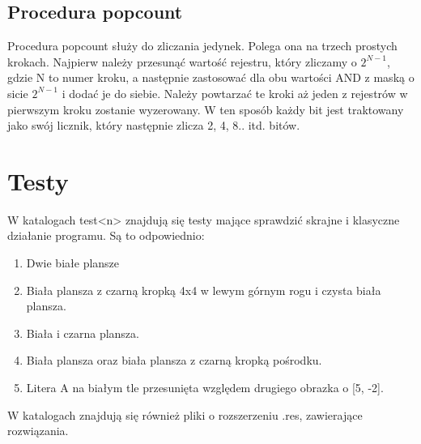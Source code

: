 \documentclass{article}
\begin{document}
\subsection{Procedura popcount}
Procedura popcount służy do zliczania jedynek. Polega ona na trzech prostych krokach. Najpierw należy przesunąć wartość rejestru, który 
zliczamy o $2^{N-1}$, gdzie N to numer kroku, a następnie zastosować dla obu wartości AND z maską o sicie $2^{N-1}$ i dodać je do siebie.
Należy powtarzać te kroki aż jeden z rejestrów w pierwszym kroku zostanie wyzerowany.
W ten sposób każdy bit jest traktowany jako swój licznik, który następnie zlicza 2, 4, 8.. itd. bitów.
\section{Testy}
W katalogach test<n> znajdują się testy mające sprawdzić skrajne i klasyczne działanie programu. Są to odpowiednio:
\begin{enumerate}
 \item Dwie białe plansze
 \item Biała plansza z czarną kropką 4x4 w lewym górnym rogu i czysta biała plansza.
 \item Biała i czarna plansza.
 \item Biała plansza oraz biała plansza z czarną kropką pośrodku.
 \item Litera A na białym tle przesunięta względem drugiego obrazka o [5, -2].
\end{enumerate}
W katalogach znajdują się również pliki o rozszerzeniu .res, zawierające rozwiązania.
\end{document}
